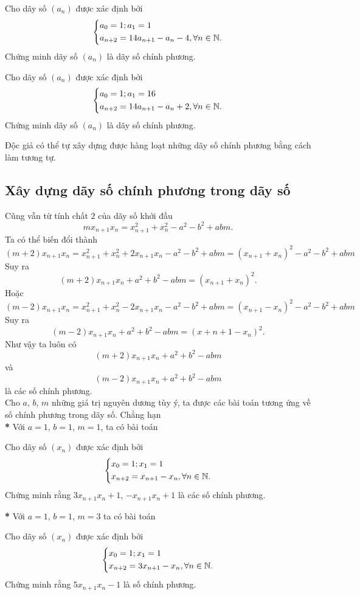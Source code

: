 \begin{vd}%
	Cho dãy số $(a_n)$ được xác định bởi
	$$\left\{\begin{aligned}&a_0=1;a_1=1\\&a_{n+2}=14a_{n+1}-a_n-4,\forall n\in\mathbb{N}.\end{aligned}\right.$$
	Chứng minh dãy số $(a_n)$ là dãy số chính phương.
\end{vd}

\begin{vd}%
	Cho dãy số $(a_n)$ được xác định bởi
	$$\left\{\begin{aligned}&a_0=1;a_1=16\\&a_{n+2}=14a_{n+1}-a_n+2,\forall n\in\mathbb{N}.\end{aligned}\right.$$
	Chứng minh dãy số $(a_n)$ là dãy số chính phương.
\end{vd}
Độc giả có thể tự xây dựng được hàng loạt những dãy số chính phương bằng cách làm tương tự.

\subsection{Xây dựng dãy số chính phương trong dãy số}
Cũng vẫn từ tính chất $2$ của dãy số khởi đầu
$$mx_{n+1}x_n=x^2_{n+1}+x^2_n-a^2-b^2+abm.$$
Ta có thể biến đổi thành
$$(m+2)x_{n+1}x_n=x^2_{n+1}+x^2_n+2x_{n+1}x_n-a^2-b^2+abm=(x_{n+1}+x_n)^2-a^2-b^2+abm$$
Suy ra $$(m+2)x_{n+1}x_n+a^2+b^2-abm=(x_{n+1}+x_n)^2.$$
Hoặc $$(m-2)x_{n+1}x_n=x^2_{n+1}+x^2_n-2x_{n+1}x_n-a^2-b^2+abm=(x_{n+1}-x_n)^2-a^2-b^2+abm$$
Suy ra 
$$(m-2)x_{n+1}x_n+a^2+b^2-abm=(x+{n+1}-x_n)^2.$$
Như vậy ta luôn có
$$(m+2)x_{n+1}x_n+a^2+b^2-abm$$
và 
$$(m-2)x_{n+1}x_n+a^2+b^2-abm$$
là các số chính phương.\\
Cho $a$, $b$, $m$ những giá trị nguyên dương tùy ý, ta được các bài toán tương ứng về số chính phương trong dãy số. Chẳng hạn\\
\textbf{*} Với $a=1$, $b=1$, $m=1$, ta có bài toán
\begin{vd}%
	Cho dãy số $(x_n)$ được xác định bởi $$\left\{\begin{aligned}&x_0=1;x_1=1\\&x_{n+2}=x_{n+1}-x_n,\forall n\in\mathbb{N}.\end{aligned}\right.$$
	Chứng minh rằng $3x_{n+1}x_n+1$, $-x_{n+1}x_n+1$ là các số chính phương.
\end{vd}
\textbf{*} Với $a=1$, $b=1$, $m=3$ ta có bài toán
\begin{vd}%
	Cho dãy số $(x_n)$ được xác định bởi
	$$\left\{\begin{aligned}&x_0=1;x_1=1\\&x_{n+2}=3x_{n+1}-x_n,\forall n\in\mathbb{N}.\end{aligned}\right.$$
	Chứng minh rằng $5x_{n+1}x_n-1$ là số chính phương.
\end{vd}
